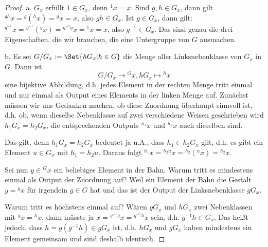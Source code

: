 \begin{proof}
a. $G_x$ erfüllt $1\in G_x$, denn ${^1 x}=x$. Sind $g,h\in G_x$, dann gilt ${^{gh}x} = {^g(^hx)} = {^g x} = x$, also $gh\in G_x$. Ist $g\in G_x$, dann gilt: ${^{g^{-1}} x} = {^{g^{-1}}(^g x)} = {^{g^{-1}g}x} = {^1 x} = x$, also $g^{-1}\in G_x$. Das sind genau die drei Eigenschaften, die wir brauchen, die eine Untergruppe von $G$ ausmachen.

\medbreak
b. Es sei $G/G_x:=\Set{hG_x | h\in G}$ die Menge aller Linksnebenklasse von $G_x$ in $G$. Dann ist
\[G/G_x \to {^G x}, hG_x \mapsto {^h x}\]
eine bijektive Abbildung, d.h. jedes Element in der rechten Menge tritt einmal und nur einmal als Output eines Elements in der linken Menge auf. Zunächst müssen wir uns Gedanken machen, ob diese Zuordnung überhaupt sinnvoll ist, d.h. ob, wenn dieselbe Nebenklasse auf zwei verschiedene Weisen geschrieben wird $h_1 G_x = h_2 G_x$, die entsprechenden Outputs ${^{h_1} x}$ und ${^{h_2} x}$ auch dieselben sind.

Das gilt, denn $h_1 G_x = h_2 G_x$ bedeutet ja u.A., dass $h_1\in h_2 G_x$ gilt, d.h. es gibt ein Element $u\in G_x$ mit $h_1 = h_2 u$. Daraus folgt ${^{h_1} x} = {^{h_2 u} x} = {^{h_2}(^u x)} = {^{h_2} x}$.

\medbreak
Sei nun $y\in{^G x}$ ein beliebiges Element in der Bahn. Warum tritt es mindestens einmal als Output der Zuordnung auf? Weil ein Element der Bahn die Gestalt $y={^g x}$ für irgendein $g\in G$ hat und das ist der Output der Linksnebenklasse $gG_x$.

Warum tritt es höchstens einmal auf? Wären $gG_x$ und $hG_x$ zwei Nebenklassen mit ${^g x} = {^h x}$, dann müsste ja $x={^{g^{-1} g} x} ={^{g^{-1} h}x}$ sein, d.h. $g^{-1} h\in G_x$. Das heißt jedoch, dass $h=g(g^{-1} h)\in gG_x$ ist, d.h. $hG_x$ und $gG_x$ haben mindestens ein Element gemeinsam und sind deshalb identisch.
\end{proof}

